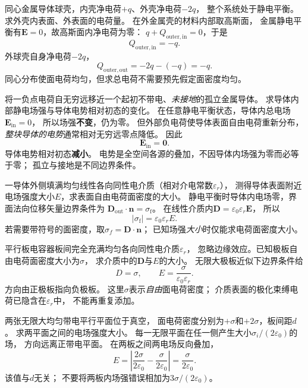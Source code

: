 \problemtext 同心金属导体球壳，内壳净电荷$+q$、外壳净电荷$-2q$，
整个系统处于静电平衡。求外壳内表面、外表面的电荷量。
\workings
在外金属壳的材料内部取高斯面，
金属静电平衡有$\bm E=0$，故高斯面内净电荷为零：
$q+Q_{\mathrm{outer,in}}=0$，于是
\[
\boxed{Q_{\mathrm{outer,in}}=-q}.
\]
外球壳自身净电荷$-2q$，
\[
\boxed{Q_{\mathrm{outer,out}}=-2q-(-q)=-q}.
\]
\crosscheck 同心分布使面电荷均匀，但求总电荷不需要预先假定面密度均匀。

\problemtext 将一负点电荷自无穷远移近一个起初不带电、\emph{未接地}的孤立金属导体。
求导体内部静电场强与导体电势相对初态的变化。
\workings
在任意静电平衡状态，导体内总电场$\bm E_{\mathrm{in}}=0$，
所以场强\textbf{不变}，仍为零。
但外部负电荷使导体表面自由电荷重新分布，
\emph{整块导体的电势}通常相对无穷远零点降低。
因此
\[
\boxed{\bm E_{\mathrm{in}}=\bm0}.
\]
导体电势相对初态\textbf{减小}。
\crosscheck 电势是全空间各源的叠加，不因导体内场强为零而必等于零；
孤立与接地是不同边界条件。

\problemtext 一导体外侧填满均匀线性各向同性电介质（相对介电常数$\varepsilon_r$），
测得导体表面附近电场强度大小$E$，求表面自由电荷面密度的大小。
\workings
静电平衡时导体内电场零，界面法向位移矢量边界条件为
$\bm D_{\mathrm{out}}\cdot\bm n=\sigma_{\mathrm f}$。
在线性介质内$\bm D=\varepsilon_0\varepsilon_r\bm E$，
所以
\[
\boxed{|\sigma_{\mathrm f}|=\varepsilon_0\varepsilon_r E}.
\]
\crosscheck 若需要带符号的面密度，取$\sigma_f=\bm D\cdot\bm n$；
已知场强\emph{大小}时仅能求电荷面密度大小。

\problemtext 平行板电容器板间完全充满均匀各向同性电介质$\varepsilon_r$，
忽略边缘效应。已知极板自由电荷面密度大小为$\sigma$，
求介质中的$\bm D$与$E$的大小。
\workings
无限大极板近似下边界条件给
\[
\boxed{D=\sigma},\qquad
\boxed{E=\frac{\sigma}{\varepsilon_0\varepsilon_r}}.
\]
方向由正极板指向负极板。
\crosscheck 这里$\sigma$表示\emph{自由}面电荷密度；
介质表面的极化束缚电荷已隐含在$\varepsilon_r$中，
不能再重复添加。

\problemtext 两张无限大均匀带电平行平面位于真空，
面电荷密度分别为$+\sigma$和$+2\sigma$，板间距$d$。
求两平面之间的电场强度大小。
\workings
每一无限平面在任一侧产生大小$\sigma_i/(2\varepsilon_0)$的场，
方向远离正带电平面。
在两板之间两电场反向叠加，
\[
\boxed{E=\left|\frac{2\sigma}{2\varepsilon_0}
-\frac{\sigma}{2\varepsilon_0}\right|
=\frac{\sigma}{2\varepsilon_0}}.
\]
\crosscheck 该值与$d$无关；
不要将两板内场强错误相加为$3\sigma/(2\varepsilon_0)$。

